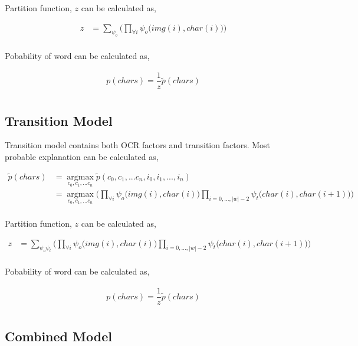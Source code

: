 \documentclass[paper=a4, fontsize=11pt]{scrartcl} %
\DeclareMathOperator*{\argmax}{argmax}
\newcommand*{\argmaxl}{\argmax\limits}
\numberwithin{equation}{section} %
\numberwithin{figure}{section} %
\numberwithin{table}{section} %
\begin{document}
Partition function, $z$ can be calculated as,

\begin{align*}
	z & = \displaystyle \sum_{\psi_{o}}^{} \bigg(\displaystyle \prod_{\forall i}^{}  \psi_{o}\big(img(i),char(i)\big) \bigg)\\
\end{align*}

Pobability of word can be calculated as,

\begin{align*}
	p(chars) = \dfrac{1}{z} \tilde{p}(chars) \\
\end{align*}

\subsection{Transition Model}



\par
Transition model contains both OCR factors and transition factors. Most probable explanation can be calculated as,

\begin{align*}
	\tilde{p}(chars) & = \argmaxl_{c_0,c_1,...c_n} \tilde{p}(c_0,c_1,...c_n,i_0,i_1,...,i_n) \\
					 & = \argmaxl_{c_0,c_1,...c_n} \bigg( \displaystyle \prod_{\forall i}^{}  \psi_{o}\big(img(i),char(i)\big) \displaystyle \prod_{i=0,...,|w|-2}^{}  \psi_{t}\big(char(i),char(i+1)\big) \bigg)\\
\end{align*}

Partition function, $z$ can be calculated as,

\begin{align*}
	z & = \displaystyle \sum_{\psi_{o} \psi_{t}}^{} \bigg( \displaystyle \prod_{\forall i}^{}  \psi_{o}\big(img(i),char(i)\big) \displaystyle \prod_{i=0,...,|w|-2}^{}  \psi_{t}\big(char(i),char(i+1)\big) \bigg)\\
\end{align*}

Pobability of word can be calculated as,

\begin{align*}
	p(chars) = \dfrac{1}{z} \tilde{p}(chars) \\
\end{align*}

\subsection{Combined Model}
\end{document}
